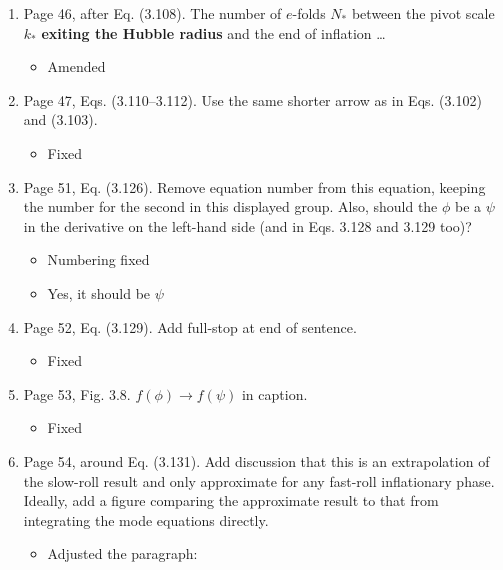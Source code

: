 \documentclass[11pt]{article}
\begin{document}
\begin{enumerate}
\begin{itemize}
  \end{itemize}
\item Page 46, after Eq. (3.108). The number of $e$-folds $N_\ast$
  between the pivot scale $k_\ast$ \textbf{exiting the Hubble radius}
  and the end of inflation \ldots
  \begin{itemize}
    \item Amended
  \end{itemize}
\item Page 47, Eqs. (3.110--3.112). Use the same shorter arrow as in
  Eqs. (3.102) and (3.103).
  \begin{itemize}
    \item Fixed
  \end{itemize}
\item Page 51, Eq. (3.126). Remove equation number from this equation,
  keeping the number for the second in this displayed group. Also,
  should the $\phi$ be a $\psi$ in the derivative on the left-hand
  side (and in Eqs. 3.128 and 3.129 too)?
  \begin{itemize}
    \item Numbering fixed
    \item Yes, it should be $\psi$
  \end{itemize}
\item Page 52, Eq. (3.129). Add full-stop at end of sentence.
  \begin{itemize}
    \item Fixed
  \end{itemize}
\item Page 53, Fig. 3.8. $f(\phi) \rightarrow f(\psi)$ in caption.
  \begin{itemize}
    \item Fixed
  \end{itemize}
\item Page 54, around Eq. (3.131). Add discussion that this is an
  extrapolation of the slow-roll result and only approximate for any
  fast-roll inflationary phase. Ideally, add a figure comparing the
  approximate result to that from integrating the mode equations directly.
  \begin{itemize}
      \item Adjusted the paragraph:

\end{itemize}
\end{enumerate}
\end{document}
